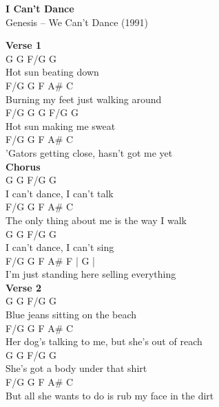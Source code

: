 \documentclass[a4paper]{article}
\begin{document}
    \begin{center}
        \textbf{I Can't Dance}
        ~\\
        Genesis -- We Can't Dance (1991)
    \end{center}
    {
        \scriptsize
        \textbf{Verse 1}
        ~\\
        {
            \cutive
            \obeyspaces
G        G  F/G G
\\
 Hot sun beating  down
\\
F/G G                    F  A\#    C
\\
    Burning my feet just walking around
\\
F/G G        G F/G  G
\\
     Hot sun making me sweat
\\
F/G G                        F       A\# C
\\
   'Gators getting close, hasn't got me yet
\\

        }
        \textbf{Chorus}
        ~\\
        {
            \cutive
            \obeyspaces
G              G F/G G
\\
I can't dance, I can't talk
\\
F/G  G                      F       A\# C
\\
 The only thing about me is the way I walk
\\
G              G F/G G
\\
I can't dance, I can't sing
\\
F/G G                      F  A\#   F   | G | %
\\
    I'm just standing here selling everything
\\

        }
        \textbf{Verse 2}
        ~\\
        {
            \cutive
            \obeyspaces
G                   G  F/G G
\\
 Blue jeans sitting on   the  beach
\\
F/G   G                        F     A\#     C
\\
  Her dog's talking to me, but she's out of reach
\\
G                 G F/G G
\\
 She's got a body under that shirt
\\
F/G   G                          F       A\#     C
\\
  But all she wants to do is rub my face in the dirt
\\

}}
\end{document}
